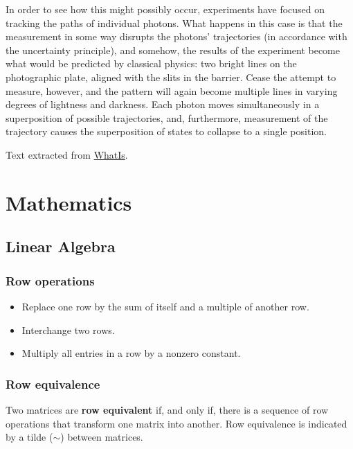 \documentclass[oneside]{book} %
\theoremstyle{plain}
\begin{document}
In order to see how this might possibly occur, experiments have focused on
tracking the paths of individual photons. What happens in this case is that the
measurement in some way disrupts the photons' trajectories (in accordance with
the uncertainty principle), and somehow, the results of the experiment become
what would be predicted by classical physics: two bright lines on the
photographic plate, aligned with the slits in the barrier. Cease the attempt to
measure, however, and the pattern will again become multiple lines in varying
degrees of lightness and darkness. Each photon moves simultaneously in a
superposition of possible trajectories, and, furthermore, measurement of the
trajectory causes the superposition of states to collapse to a single position.

Text extracted from
\href{http://whatis.techtarget.com/definition/superposition}{WhatIs}.

\part{Mathematics}

\chapter{Linear Algebra}

\section{Row operations}
\begin{itemize}
\item{Replace one row by the sum of itself and a multiple of another row.}
\item{Interchange two rows.}
\item{Multiply all entries in a row by a nonzero constant.}
\end{itemize}

\section{Row equivalence}
Two matrices are \textbf{row equivalent} if, and only if, there is a sequence
of row operations that transform one matrix into another.
Row equivalence is indicated by a tilde ($\sim$) between matrices.
\end{document}

